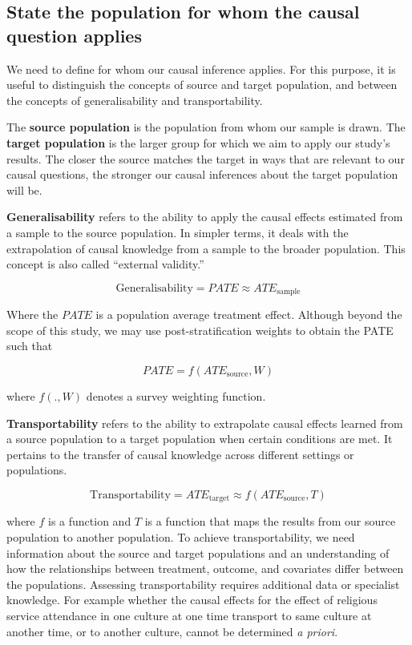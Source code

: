 \documentclass[
  singlecolumn]{report}
\begin{document}
\hypertarget{state-the-population-for-whom-the-causal-question-applies}{%
\subsection{\texorpdfstring{\textbf{State the population for whom the
causal question
applies}}{State the population for whom the causal question applies}}\label{state-the-population-for-whom-the-causal-question-applies}}

We need to define for whom our causal inference applies. For this
purpose, it is useful to distinguish the concepts of source and target
population, and between the concepts of generalisability and
transportability.

The \textbf{source population} is the population from whom our sample is
drawn. The \textbf{target population} is the larger group for which we
aim to apply our study's results. The closer the source matches the
target in ways that are relevant to our causal questions, the stronger
our causal inferences about the target population will be.

\textbf{Generalisability} refers to the ability to apply the causal
effects estimated from a sample to the source population. In simpler
terms, it deals with the extrapolation of causal knowledge from a sample
to the broader population. This concept is also called ``external
validity.''

\[\text{Generalisability} = PATE \approx ATE_{\text{sample}}\]

Where the \(PATE\) is a population average treatment effect. Although
beyond the scope of this study, we may use post-stratification weights
to obtain the PATE such that

\[PATE =  f(ATE_{\text{source}}, W)\]

where \(f(.,W)\) denotes a survey weighting function.

\textbf{Transportability} refers to the ability to extrapolate causal
effects learned from a source population to a target population when
certain conditions are met. It pertains to the transfer of causal
knowledge across different settings or populations.

\[\text{Transportability} = ATE_{\text{target}} \approx f(ATE_{\text{source}}, T)\]

where \(f\) is a function and \(T\) is a function that maps the results
from our source population to another population. To achieve
transportability, we need information about the source and target
populations and an understanding of how the relationships between
treatment, outcome, and covariates differ between the populations.
Assessing transportability requires additional data or specialist
knowledge. For example whether the causal effects for the effect of
religious service attendance in one culture at one time transport to
same culture at another time, or to another culture, cannot be
determined \emph{a priori}.
\end{document}
